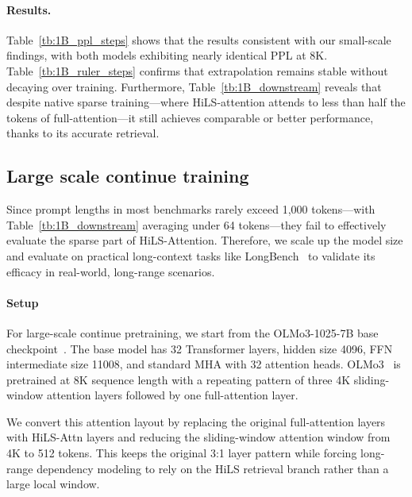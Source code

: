 \paragraph{Results.}
Table~\ref{tb:1B_ppl_steps} shows that the results consistent with our small-scale findings, with both models exhibiting nearly identical PPL at 8K. Table~\ref{tb:1B_ruler_steps} confirms that extrapolation remains stable without decaying over training. Furthermore, Table~\ref{tb:1B_downstream} reveals that despite native sparse training—where HiLS-attention attends to less than half the tokens of full-attention—it still achieves comparable or better performance, thanks to its accurate retrieval.

% 




\subsection{Large scale continue training}
Since prompt lengths in most benchmarks rarely exceed 1,000 tokens—with Table~\ref{tb:1B_downstream} averaging under 64 tokens—they fail to effectively evaluate the sparse part of HiLS-Attention. Therefore, we scale up the model size and evaluate on practical long-context tasks like LongBench~\cite{bai2024longbench} to validate its efficacy in real-world, long-range scenarios.
\paragraph{Setup} %
For large-scale continue pretraining, we start from the OLMo3-1025-7B base checkpoint~\citep{allenai_olmo3_1025_7b_checkpoint}. The base model has 32 Transformer layers, hidden size 4096, FFN intermediate size 11008, and standard MHA with 32 attention heads. OLMo3~\citep{olmo2025olmo} is pretrained at 8K sequence length with a repeating pattern of three 4K sliding-window attention layers followed by one full-attention layer.


We convert this attention layout by replacing the original full-attention layers with HiLS-Attn layers and reducing the sliding-window attention window from 4K to 512 tokens. This keeps the original 3:1 layer pattern while forcing long-range dependency modeling to rely on the HiLS retrieval branch rather than a large local window.


